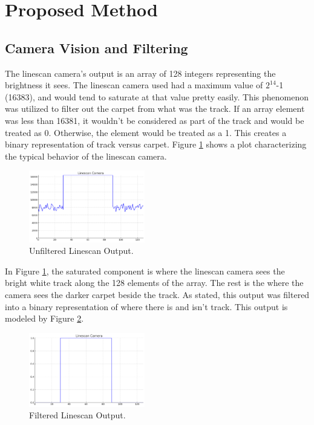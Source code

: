 \documentclass[conference]{IEEEtran}
\begin{document}
\section{Proposed Method}

\subsection{Camera Vision and Filtering}

The linescan camera's output is an array of 128 integers representing the brightness it sees. The linescan camera used had a maximum value of $2^{14}$-1 (16383), and would tend to saturate at that value pretty easily. This phenomenon was utilized to filter out the carpet from what was the track. If an array element was less than 16381, it wouldn't be considered as part of the track and would be treated as 0. Otherwise, the element would be treated as a 1. This creates a binary representation of track versus carpet. Figure \ref{fig:linescan} shows a plot characterizing the typical behavior of the linescan camera.

\begin{figure}[htbp]
	\centerline{\includegraphics[width=0.45\textwidth]{images/linescan.png}}
	\caption{Unfiltered Linescan Output.}
	\label{fig:linescan}
\end{figure}

In Figure \ref{fig:linescan}, the saturated component is where the linescan camera sees the bright white track along the 128 elements of the array. The rest is the where the camera sees the darker carpet beside the track. As stated, this output was filtered into a binary representation of where there is and isn't track. This output is modeled by Figure \ref{fig:linescanFiltered}.

\begin{figure}[htbp]
	\centerline{\includegraphics[width=0.45\textwidth]{images/linescanFiltered.png}}
	\caption{Filtered Linescan Output.}
	\label{fig:linescanFiltered}
\end{figure}
\end{document}
